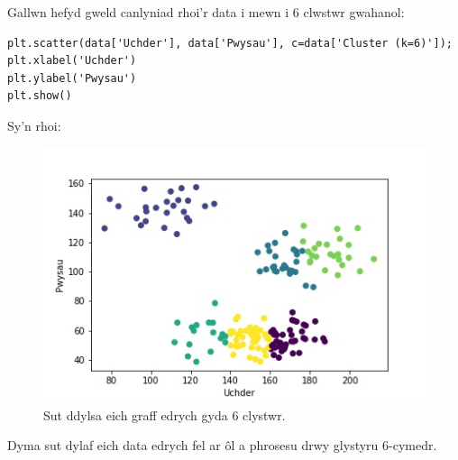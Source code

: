 Gallwn hefyd gweld canlyniad rhoi'r data i mewn i 6 clwstwr gwahanol: 

\begin{verbatim}
plt.scatter(data['Uchder'], data['Pwysau'], c=data['Cluster (k=6)']);
plt.xlabel('Uchder')
plt.ylabel('Pwysau')
plt.show()
\end{verbatim}

Sy'n rhoi:

\begin{figure}[H]
\begin{center}
\includegraphics[width=0.7\linewidth]{../img/6clystwrpython.jpeg}
\caption{Sut ddylsa eich graff edrych gyda 6 clystwr.}
\label{fig:6clystwrpython}
\end{center}
\end{figure}

Dyma sut dylaf eich data edrych fel ar \^{o}l a phrosesu drwy glystyru 6-cymedr. 
